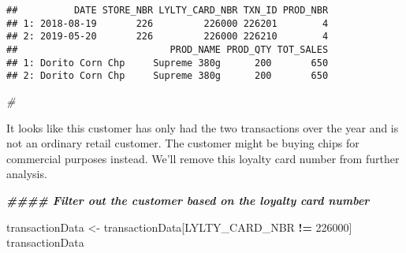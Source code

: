 \documentclass[
]{article}
\newenvironment{Shaded}{\begin{snugshade}}{\end{snugshade}}
\newcommand{\CommentTok}[1]{\textcolor[rgb]{0.56,0.35,0.01}{\textit{#1}}}
\newcommand{\DecValTok}[1]{\textcolor[rgb]{0.00,0.00,0.81}{#1}}
\newcommand{\DocumentationTok}[1]{\textcolor[rgb]{0.56,0.35,0.01}{\textbf{\textit{#1}}}}
\newcommand{\NormalTok}[1]{#1}
\newcommand{\OtherTok}[1]{\textcolor[rgb]{0.56,0.35,0.01}{#1}}
\newcommand{\SpecialCharTok}[1]{\textcolor[rgb]{0.81,0.36,0.00}{\textbf{#1}}}
\begin{document}
\begin{verbatim}
##          DATE STORE_NBR LYLTY_CARD_NBR TXN_ID PROD_NBR
## 1: 2018-08-19       226         226000 226201        4
## 2: 2019-05-20       226         226000 226210        4
##                           PROD_NAME PROD_QTY TOT_SALES
## 1: Dorito Corn Chp     Supreme 380g      200       650
## 2: Dorito Corn Chp     Supreme 380g      200       650
\end{verbatim}

\begin{Shaded}
\begin{Highlighting}[]
\CommentTok{\#}
\end{Highlighting}
\end{Shaded}

It looks like this customer has only had the two transactions over the
year and is not an ordinary retail customer. The customer might be
buying chips for commercial purposes instead. We'll remove this loyalty
card number from further analysis.

\begin{Shaded}
\begin{Highlighting}[]
\DocumentationTok{\#\#\#\# Filter out the customer based on the loyalty card number}

\NormalTok{transactionData }\OtherTok{\textless{}{-}}\NormalTok{ transactionData[LYLTY\_CARD\_NBR }\SpecialCharTok{!=} \DecValTok{226000}\NormalTok{]}
\NormalTok{transactionData}
\end{Highlighting}
\end{Shaded}
\end{document}
